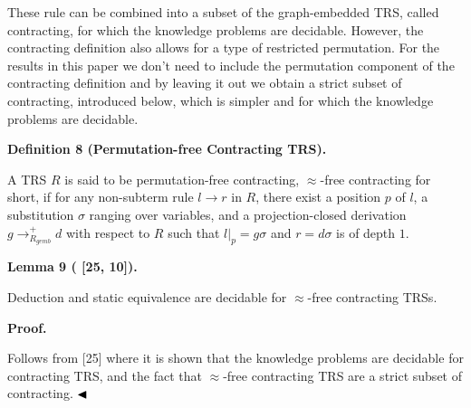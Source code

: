 These rule can be combined into a subset of the graph-embedded TRS, called contracting, for which the knowledge problems are decidable. However, the contracting definition also allows for a type of restricted permutation. For the results in this paper we don’t need to include the permutation component of the contracting definition and by leaving it out we obtain a strict subset of contracting, introduced below, which is simpler and for which the knowledge problems are decidable.\par
 
 
 
\par\medskip\noindent\textbf{Definition 8 (Permutation-free Contracting TRS).}\par
 
 
A TRS $R$ is said to be permutation-free contracting, $\approx$-free contracting for short, if for any non-subterm rule $l\rightarrow r$ in $R$, there exist a position $p$ of $l$, a substitution $\sigma$ ranging over variables, and a projection-closed derivation $g\rightarrow_{R_{gemb}}^{+}d$ with respect to $R$ such that $l{|_{p}}=g\sigma$ and $r=d\sigma$ is of depth $1$.\par
 
 
 
 
\par\medskip\noindent\textbf{Lemma 9 ( [25, 10]).}\par
 
 
Deduction and static equivalence are decidable for $\approx$-free contracting TRSs.\par
 
 
 
 
\par\medskip\noindent\textbf{Proof.}\par
 
 
Follows from [25] where it is shown that the knowledge problems are decidable for contracting TRS, and the fact that $\approx$-free contracting TRS are a strict subset of contracting. $\hfill\blacktriangleleft$\par
 
